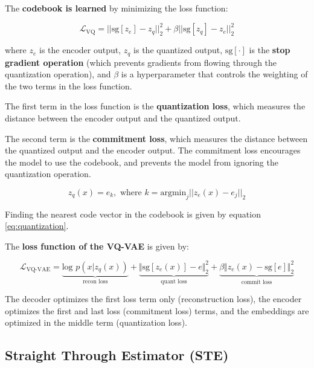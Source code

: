 The \textbf{codebook is learned} by minimizing the loss function:

\begin{equation}
    \mathcal{L}_{\text{VQ}} = || \text{sg}[z_e] - z_q ||_2^2 + \beta || \text{sg}[z_q] - z_e ||_2^2
\label{eq:vq_loss}
\end{equation}

where $z_e$ is the encoder output, $z_q$ is the quantized output, $\text{sg}[\cdot]$ is the \textbf{stop gradient operation} (which prevents gradients from flowing through the quantization operation), and $\beta$ is a hyperparameter that controls the weighting of the two terms in the loss function. 

The first term in the loss function is the \textbf{quantization loss}, which measures the distance between the encoder output and the quantized output. 

The second term is the \textbf{commitment loss}, which measures the distance between the quantized output and the encoder output. The commitment loss encourages the model to use the codebook, and prevents the model from ignoring the quantization operation.

\begin{equation}
    \label{eq:quantization}
    z_q(x)=e_k, \text{  where } k = \text{argmin}_j || z_e(x) - e_j ||_2
\end{equation}

Finding the nearest code vector in the codebook is given by equation \ref{eq:quantization}.

The \textbf{loss function of the VQ-VAE} is given by:

\begin{equation}
    \mathcal{L}_\text{VQ-VAE} = 
    \underbrace{\text{log } p(x|z_q(x))}_{\text{recon loss}} + 
    \underbrace{\Vert \text{sg}[z_e(x)] - e \Vert_2^2}_{\text{quant loss}} +
    \underbrace{\beta \Vert z_e(x) - \text{sg}[e] \Vert_2^2}_{\text{commit loss}}
    \label{eq:vqvae_loss}
\end{equation}
    
The decoder optimizes the first loss term only (reconstruction loss), the encoder optimizes the first and last loss (commitment loss) terms, and the embeddings are optimized in the middle term (quantization loss).






\subsection{Straight Through Estimator (STE)}
\label{ste}

